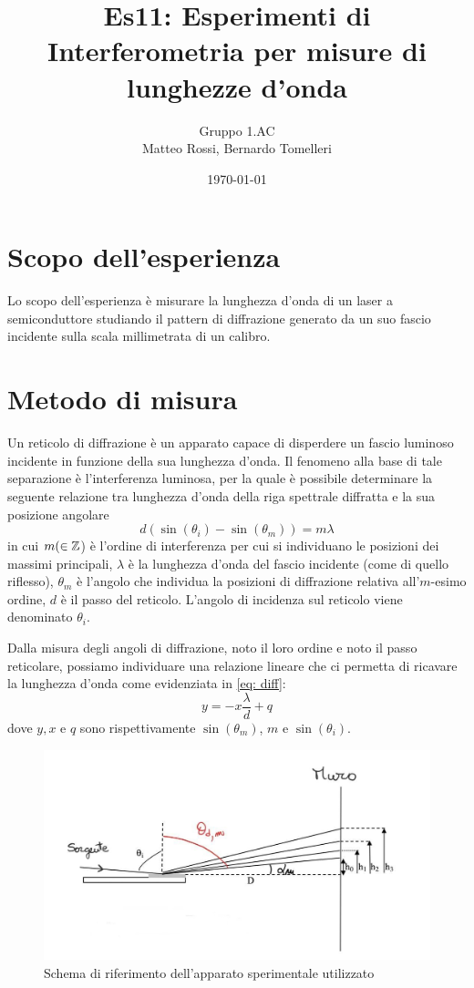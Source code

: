 \documentclass[10pt, a4paper, italian]{article}
\author{Gruppo 1.AC \\ Matteo Rossi, Bernardo Tomelleri}
\title{Es11: Esperimenti di Interferometria per misure di lunghezze d'onda}
\begin{document}
\date{\today}
\maketitle

\section{Scopo dell'esperienza}
Lo scopo dell'esperienza è misurare la lunghezza d'onda di un laser
a semiconduttore studiando il pattern di diffrazione generato da un suo
fascio incidente sulla scala millimetrata di un calibro.

\section{Metodo di misura}
Un reticolo di diffrazione è un apparato capace di disperdere un fascio
luminoso incidente in funzione della sua lunghezza d'onda. Il fenomeno alla
base di tale separazione è l'interferenza luminosa, per la quale è possibile
determinare la seguente relazione tra lunghezza d'onda della riga spettrale
diffratta e la sua posizione angolare
\begin{equation}
d(\sin(\theta _i) - \sin(\theta _m)) = m \lambda
\label{eq: diff}
\end{equation}
in cui $m (\in \mathbb Z$) è l'ordine di interferenza per cui si individuano le
posizioni dei massimi principali, $\lambda$ è la lunghezza d'onda del fascio
incidente (come di quello riflesso), $\theta _m$ è l'angolo che
individua la posizioni di diffrazione relativa all'$m$-esimo ordine, $d$ è il
passo del reticolo.
L'angolo di incidenza sul reticolo viene denominato $\theta _i$.

Dalla misura degli angoli di diffrazione, noto il loro ordine e noto il passo
reticolare, possiamo individuare una relazione lineare che ci permetta di
ricavare la lunghezza d'onda come evidenziata in \cref{eq: diff}:
\begin{equation}
y = -x \frac{\lambda}{d} + q
\label{eq: fit}
\end{equation}
dove $y,x$ e $q$ sono rispettivamente $\sin(\theta _m)$, $m$ e
$\sin(\theta _i)$.

\begin{figure}
\includegraphics[width=\textwidth]{0}
\caption{Schema di riferimento dell'apparato sperimentale utilizzato
\label{fig: schema}}
\end{figure}
\end{document}
